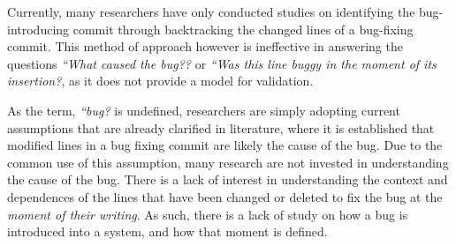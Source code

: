 \documentclass[a4paper, 12pt]{book}
\begin{document}
Currently, many researchers have only conducted studies on identifying the bug-introducing commit through backtracking the changed lines of a bug-fixing commit. This method of approach however is ineffective in answering the questions \emph{``What caused the bug??} or \emph{``Was this line buggy in the moment of its insertion?}, as it does not provide a model for validation. 

As the term, \emph{``bug?} is undefined, researchers are simply adopting current assumptions that are already clarified in literature, where it is established that modified lines in a bug fixing commit are likely the cause of the bug. Due to the common use of this assumption, many research are not invested in understanding the cause of the bug. There is a lack of interest in understanding the context and dependences of the lines that have been changed or deleted to fix the bug at the \emph{moment of their writing}. As such, there is a lack of study on how a bug is introduced into a system, and how that moment is defined. 

\end{document}
